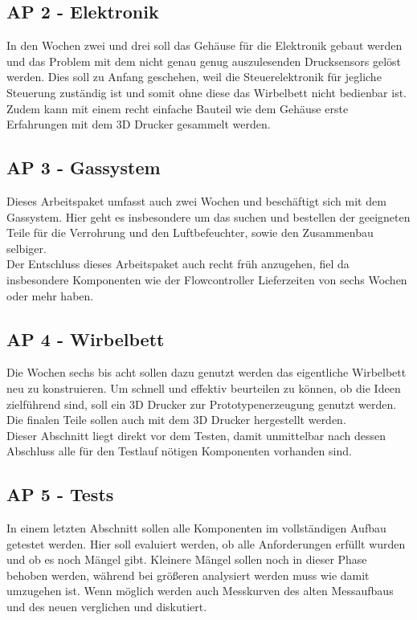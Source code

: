\subsection{AP 2 - Elektronik}

In den Wochen zwei und drei soll das Gehäuse für die Elektronik gebaut werden und das Problem mit dem nicht genau genug auszulesenden Drucksensors gelöst werden. Dies soll zu Anfang geschehen, weil die Steuerelektronik für jegliche Steuerung zuständig ist und somit ohne diese das Wirbelbett nicht bedienbar ist. Zudem kann mit einem recht einfache Bauteil wie dem Gehäuse erste Erfahrungen mit dem 3D Drucker gesammelt werden.

\subsection{AP 3 - Gassystem}

Dieses Arbeitspaket umfasst auch zwei Wochen und beschäftigt sich mit dem Gassystem. Hier geht es insbesondere um das suchen und bestellen der geeigneten Teile für die Verrohrung und den Luftbefeuchter, sowie den Zusammenbau selbiger. \\
Der Entschluss dieses Arbeitspaket auch recht früh anzugehen, fiel da insbesondere Komponenten wie der Flowcontroller Lieferzeiten von sechs Wochen oder mehr haben. 

\subsection{AP 4 - Wirbelbett}

Die Wochen sechs bis acht sollen dazu genutzt werden das eigentliche Wirbelbett neu zu konstruieren. Um schnell und effektiv beurteilen zu können, ob die Ideen zielführend sind, soll ein 3D Drucker zur Prototypenerzeugung genutzt werden. Die finalen Teile sollen auch mit dem 3D Drucker hergestellt werden. \\
Dieser Abschnitt liegt direkt vor dem Testen, damit unmittelbar nach dessen Abschluss alle für den Testlauf nötigen Komponenten vorhanden sind.


\subsection{AP 5 - Tests}

In einem letzten Abschnitt sollen alle Komponenten im vollständigen Aufbau getestet werden. Hier soll evaluiert werden, ob alle Anforderungen erfüllt wurden und ob es noch Mängel gibt. Kleinere Mängel sollen noch in dieser Phase behoben werden, während bei größeren analysiert werden muss wie damit umzugehen ist. Wenn möglich werden auch Messkurven des alten Messaufbaus und des neuen verglichen und diskutiert.





















